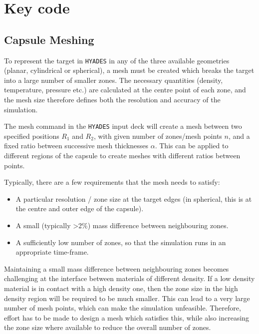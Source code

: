

\chapter{Key code} \label{app:KeyCode}

\minitoc


\section{Capsule Meshing}
To represent the target in \texttt{HYADES} in any of the three available geometries (planar, cylindrical or spherical), a mesh must be created which breaks the target into a large number of smaller zones. The necessary quantities (density, temperature, pressure etc.) are calculated at the centre point of each zone, and the mesh size therefore defines both the resolution and accuracy of the simulation. 

The mesh command in the \texttt{HYADES} input deck will create a mesh between two specified positions $R_1$ and $R_2$, with given number of zones/mesh points $n$, and a fixed ratio between successive mesh thicknesses $\alpha$. This can be applied to different regions of the capsule to create meshes with different ratios between points.

Typically, there are a few requirements that the mesh needs to satisfy:
\begin{itemize}
    \item A particular resolution / zone size at the target edges (in spherical, this is at the centre and outer edge of the capsule).
    \item A small (typically >2\%) mass difference between neighbouring zones.
    \item A sufficiently low number of zones, so that the simulation runs in an appropriate time-frame.
\end{itemize}

Maintaining a small mass difference between neighbouring zones becomes challenging at the interface between materials of different density. If a low density material is in contact with a high density one, then the zone size in the high density region will be required to be much smaller. This can lead to a very large number of mesh points, which can make the simulation unfeasible. Therefore, effort has to be made to design a mesh which satisfies this, while also increasing the zone size where available to reduce the overall number of zones.

